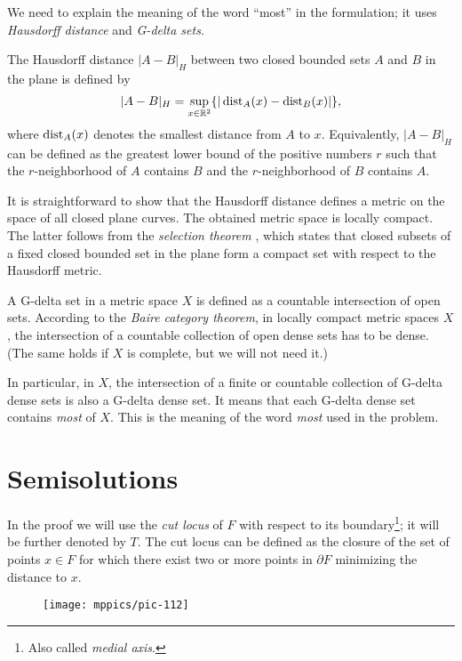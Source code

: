 We need to explain the meaning of the word ``most'' in the formulation;
it uses \emph{Hausdorff distance} and \emph{G-delta sets}.

The Hausdorff distance $|A-B|_H$ between two closed bounded sets $A$ and $B$ in the plane is defined by 
\[|A-B|_H=\sup_{x\in\mathbb{R}^2}\{|\operatorname{\rm dist}\nolimits_A(x)-\operatorname{\rm dist}\nolimits_B(x)|\},\]
where $\operatorname{\rm dist}\nolimits_A(x)$ denotes the smallest distance from $A$ to $x$.
Equivalently, $|A-B|_H$ can be defined as the greatest lower bound of the positive numbers $r$ such that the $r$-neighborhood of $A$ contains $B$ and the $r$-neighborhood of $B$ contains $A$.

It is straightforward to show that the Hausdorff distance defines a metric on the space of all closed plane curves.
The obtained metric space is locally compact.
The latter follows from the \emph{selection theorem} \cite[see \S18 in][]{blaschke},
which states that closed subsets of a fixed closed bounded set in the plane form a compact set with respect to the Hausdorff metric. 

A G-delta set in a metric space $X$ is defined as a countable intersection of open sets.
According to the \emph{Baire category theorem}, 
in locally compact metric spaces $X$,
the intersection of a countable collection of open dense sets 
has to be dense.
(The same holds if $X$ is complete, but we will not need it.)

In particular, in $X$, 
the intersection of a finite or countable collection of G-delta dense sets is also a G-delta dense set. 
It means that each G-delta dense set contains {}\emph{most} of $X$.
This is the meaning of the word {}\emph{most} used in the problem.



\section*{Semisolutions}


In the proof we will use the \emph{cut locus}
of $F$ with respect to its boundary\footnote{Also called \emph{medial axis}.};
it will be further denoted by $T$.
The cut locus can be defined as the closure
of the set of points $x\in F$ 
for which there exist two or more points in $\partial F$ minimizing the distance to $x$.

\begin{wrapfigure}{r}{35 mm}
\vskip2mm
\centering
\texttt{[image: mppics/pic-112]}
\end{wrapfigure}


